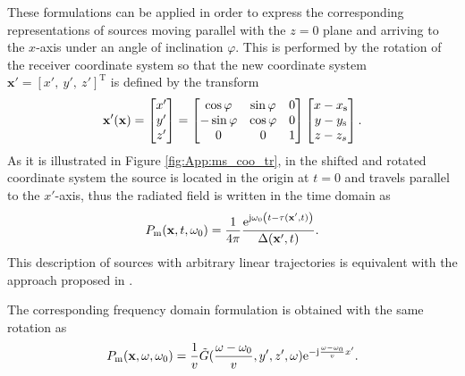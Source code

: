 These formulations can be applied in order to express the corresponding representations of sources moving parallel with the $z=0$ plane and arriving to the $x$-axis under an angle of inclination $\varphi$.
This is performed by the rotation of the receiver coordinate system so that the new coordinate system $\mathbf{x'}= [x',\ y',\ z']^{\mathrm{T}}$ is defined by the transform
%
\begin{equation}
\mathbf{x}'(\mathbf{x})=
\begin{bmatrix} x' \\ y' \\ z' \end{bmatrix}
=
\begin{bmatrix}
\cos\varphi  &  \sin\varphi & 0\\
-\sin\varphi & \cos\varphi &0\\
0       &   0 &   1
\end{bmatrix}
\begin{bmatrix} x-x_\mathrm{s} \\ y-y_\mathrm{s} \\ z -z_s \end{bmatrix}.
\label{eq:transform_matrix}
\end{equation} 
%
As it is illustrated in Figure \ref{fig:App:ms_coo_tr}, in the shifted and rotated coordinate system the source is located in the origin at $t = 0$ and travels parallel to the $x'$-axis, thus the radiated field is written in the time domain as
\begin{equation}
P_{\mathrm{m}}(\mathbf{x},t,\omega_0) = \frac{1}{4\pi} \frac{\mathrm{e}^{\mathrm{j} \omega_0 \left(t - \tau(\mathbf{x}',t) \right)}}{\Delta(\mathbf{x}',t)}.
\label{eq:inclined_field}
\end{equation}
This description of sources with arbitrary linear trajectories is equivalent with the approach proposed in \cite{Ahrens2008moving}.

The corresponding frequency domain formulation is obtained with the same rotation as
\begin{equation}
P_{\mathrm{m}}(\mathbf{x},\omega,\omega_0) =
\frac{1}{v}
\tilde{G}(\frac{\omega-\omega_0}{v}, y', z', \omega)
\mathrm{e}^{-\mathrm{j} \frac{\omega-\omega_0}{v} x'}.
\label{eq:inclined_field_omega}
\end{equation}

